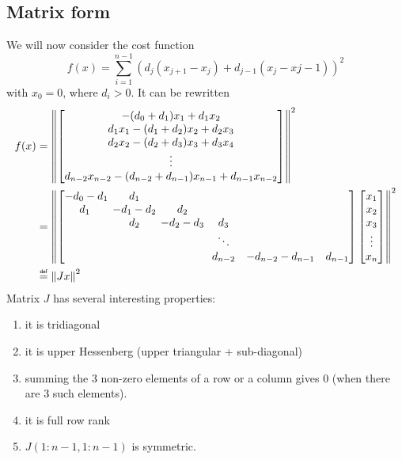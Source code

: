\documentclass[]{article}
\newcommand{\BIN}{\begin{bmatrix}}
\newcommand{\BOUT}{\end{bmatrix}}
\newcommand\eqbydef{\mathrel{\overset{\makebox[0pt]{\mbox{\normalfont\tiny\sffamily def}}}{=}}}
\begin{document}
\subsection{Matrix form}
We will now consider the cost function
\begin{equation}
  f(x) = \sum_{i=1}^{n-1} \left(d_j(x_{j+1} - x_j) + d_{j-1}(x_j - x{j-1})\right)^2
\end{equation}
with $x_0 = 0$, where $d_i>0$.
It can be rewritten
\begin{align*}
f(x) &= \left\|\BIN -(d_0+d_1)x_1 + d_1 x_2 \\ 
                    d_1 x_1 -(d_1+d_2) x_2 + d_2 x_3 \\ 
                    d_2 x_2 -(d_2+d_3) x_3 + d_3 x_4 \\ 
                    \vdots \\ 
                    d_{n-2} x_{n-2} -(d_{n-2}+d_{n-1}) x_{n-1} + d_{n-1} x_{n-2} \BOUT\right\|^2 \\
 &= \left\|\BIN -d_0-d_1 \hspace{-3pt}& d_1 & & & &\\ 
                d_1 &\hspace{-3pt} -d_1-d_2 \hspace{-3pt}& d_2 & & &\\ 
                & d_2 & \hspace{-3pt}-d_2-d_3 \hspace{-3pt}& d_3 & & \\ 
                & & & \ddots &  & \\ 
                &&& d_{n-2} & -d_{n-2}-d_{n-1} & d_{n-1} \BOUT
 \BIN x_1 \\ x_2 \\ x_3 \\ \vdots \\x_n \BOUT\right\|^2 \\
 & \eqbydef \left\|J x\right\|^2
\end{align*}
Matrix $J$ has several interesting properties:
\begin{enumerate}
	\item it is tridiagonal
  \item it is upper Hessenberg (upper triangular + sub-diagonal)
  \item summing the $3$ non-zero elements of a row or a column gives $0$ (when there are 3 such elements).
  \item it is full row rank
  \item $J(1:n-1,1:n-1)$ is symmetric.
\end{enumerate}
\end{document}
